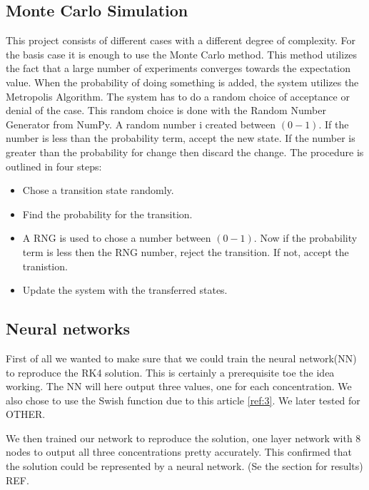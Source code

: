 \subsection{Monte Carlo Simulation}

This project consists of different cases with a different degree of complexity. For the basis case it is enough to use the Monte Carlo method. This method utilizes the fact that a large number of experiments converges towards the expectation value. When the probability of doing something is added, the system utilizes the Metropolis Algorithm. The system has to do a random choice of acceptance or denial of the case. This random choice is done with the Random Number Generator from NumPy\cite{NumPy}. A random number i created between $(0 - 1)$. If the number is less than the probability term, accept the new state. If the number is greater than the probability for change then discard the change. The procedure is outlined in four steps:

\begin{itemize}
	\item Chose a transition state randomly.
	\item Find the probability for the transition.
	\item A RNG is used to chose a number between $(0-1)$. Now if the probability term is less then the RNG number, reject the transition. If not, accept the tranistion.
	\item Update the system with the transferred states.
\end{itemize}



\subsection{Neural networks}

First of all we wanted to make sure that we could  train the neural network(NN) to reproduce the RK4 solution. This is certainly a prerequisite toe the idea working. The NN will here output three values, one for each concentration. We also chose to use the Swish function due to this article \ref{ref:3}. We later tested for OTHER.
	
	We then trained our network to reproduce the solution, one layer network with 8 nodes to output all three concentrations pretty accurately. This confirmed that the solution could be represented by a neural network. (Se the section for results) REF.
	
